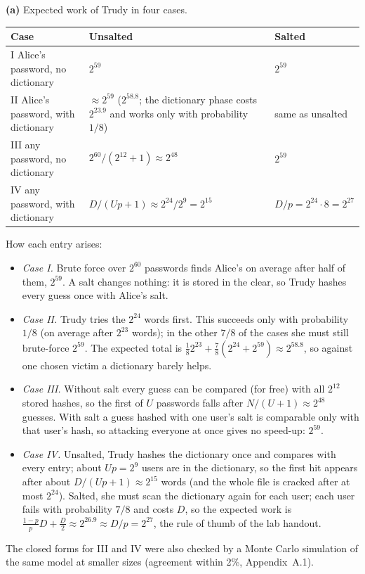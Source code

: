 \documentclass[11pt,a4paper]{article}
\begin{document}
\begin{table}[H]
\textbf{(a)} Expected work of Trudy in four cases.\par\smallskip
\centering\small
\begin{tabularx}{\textwidth}{@{}P{6.3cm}LL@{}}
\toprule
Case & Unsalted & Salted \\
\midrule
I \quad Alice's password, no dictionary & $2^{59}$ & $2^{59}$ \\
II \quad Alice's password, with dictionary & $\approx 2^{59}$ ($2^{58.8}$; the dictionary phase costs $2^{23.9}$ and works only with probability $1/8$) & same as unsalted \\
III \quad any password, no dictionary & $2^{60}/(2^{12}+1)\approx 2^{48}$ & $2^{59}$ \\
IV \quad any password, with dictionary & $D/(Up+1)\approx 2^{24}/2^{9}=2^{15}$ & $D/p = 2^{24}\cdot 8=2^{27}$ \\
\bottomrule
\end{tabularx}
\end{table}
How each entry arises:
\begin{itemize}
\item \emph{Case I.} Brute force over $2^{60}$ passwords finds Alice's on average after half of them, $2^{59}$.
A salt changes nothing: it is stored in the clear, so Trudy hashes every guess once with Alice's salt.
\item \emph{Case II.} Trudy tries the $2^{24}$ words first. This succeeds only with probability $1/8$
(on average after $2^{23}$ words); in the other $7/8$ of the cases she must still brute-force
$2^{59}$. The expected total is $\tfrac18 2^{23}+\tfrac78(2^{24}+2^{59})\approx 2^{58.8}$, so against one
chosen victim a dictionary barely helps.
\item \emph{Case III.} Without salt every guess can be compared (for free) with all $2^{12}$ stored hashes, so
the first of $U$ passwords falls after $N/(U+1)\approx 2^{48}$ guesses. With salt a guess hashed with one user's
salt is comparable only with that user's hash, so attacking everyone at once gives no speed-up: $2^{59}$.
\item \emph{Case IV.} Unsalted, Trudy hashes the dictionary once and compares with every entry; about
$Up=2^{9}$ users are in the dictionary, so the first hit appears after about $D/(Up+1)\approx 2^{15}$ words
(and the whole file is cracked after at most $2^{24}$). Salted, she must scan the dictionary again for
each user; each user fails with probability $7/8$ and costs $D$, so the expected work is
$\frac{1-p}{p}D+\frac D2\approx 2^{26.9}\approx D/p=2^{27}$, the rule of thumb of the lab handout.
\end{itemize}
The closed forms for III and IV were also checked by a Monte Carlo simulation of the same model at smaller
sizes (agreement within 2\%, Appendix~A.1).
\end{document}
